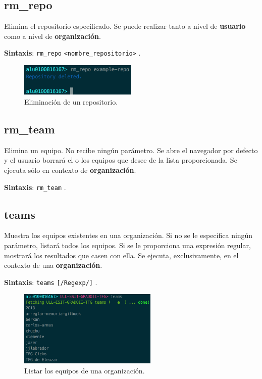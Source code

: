 \subsection{rm\_repo}
\label{3.3.17}

Elimina el repositorio especificado. Se puede realizar tanto a nivel de \textbf{usuario} como a nivel de \textbf{organización}.

\textbf{Sintaxis}: \verb|rm_repo| \verb|<nombre_repositorio>| .

\begin{figure}[H]
	\begin{center}
	\includegraphics[width=0.5\textwidth]{images/delete-repo.png}
	\caption{Eliminación de un repositorio.}
	\label{fig:custom-repo}
	\end{center}
\end{figure}

\subsection{rm\_team}
\label{3.3.18}

Elimina un equipo. No recibe ningún parámetro. Se abre el navegador por defecto y el usuario borrará el o los equipos que desee de la lista proporcionada. Se ejecuta sólo en contexto de \textbf{organización}.

\textbf{Sintaxis}: \verb|rm_team| .

\subsection{teams}
\label{3.3.19}

Muestra los equipos existentes en una organización. Si no se le especifica ningún parámetro, listará todos los equipos. Si se le proporciona una expresión regular, mostrará los resultados que casen con ella.
Se ejecuta, exclusivamente, en el contexto de una \textbf{organización}.

\textbf{Sintaxis}: \verb|teams| \verb|[/Regexp/]| .

\begin{figure}[H]
	\begin{center}
	\includegraphics[width=0.59\textwidth]{images/org-teams.png}
	\caption{Listar los equipos de una organización.}
	\label{fig:org-teams}
	\end{center}
\end{figure}

